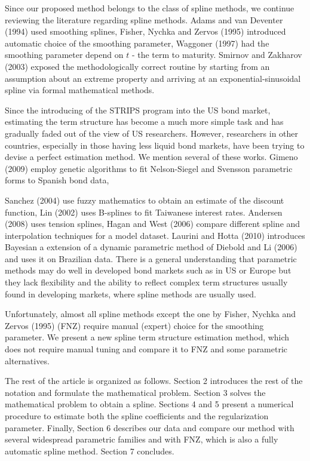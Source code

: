 \documentclass[10pt]{article}
\begin{document}
Since our proposed method belongs to the class of spline methods, we continue reviewing the literature regarding spline methods. Adams and van Deventer (1994) used smoothing splines, Fisher, Nychka and Zervos (1995) introduced automatic choice of the smoothing parameter, Waggoner (1997) had the smoothing parameter depend on $t$ - the term to maturity. Smirnov and Zakharov (2003) exposed the methodologically correct routine by starting from an assumption about an extreme property and arriving at an exponential-sinusoidal spline via formal mathematical methods.

Since the introducing of the STRIPS program into the US bond market, estimating the term structure has become a much more simple task and has gradually faded out of the view of US researchers. However, researchers in other countries, especially in those having less liquid bond markets, have been trying to devise a perfect estimation method. We mention several of these works. Gimeno (2009) employ genetic algorithms to fit Nelson-Siegel and Svensson parametric forms to Spanish bond data,

Sanchez (2004) use fuzzy mathematics to obtain an estimate of the discount function, Lin (2002) uses B-splines to fit Taiwanese interest rates. Andersen (2008) uses tension splines, Hagan and West (2006) compare different spline and interpolation techniques for a model dataset. Laurini and Hotta (2010) introduces Bayesian a extension of a dynamic parametric method of Diebold and Li (2006) and uses it on Brazilian data. There is a general understanding that parametric methods may do well in developed bond markets such as in US or Europe but they lack flexibility and the ability to reflect complex term structures usually found in developing markets, where spline methods are usually used.

Unfortunately, almost all spline methods except the one by Fisher, Nychka and Zervos (1995) (FNZ) require manual (expert) choice for the smoothing parameter. We present a new spline term structure estimation method, which does not require manual tuning and compare it to FNZ and some parametric alternatives.

The rest of the article is organized as follows. Section 2 introduces the rest of the notation and formulate the mathematical problem. Section 3 solves the mathematical problem to obtain a spline. Sections 4 and 5 present a numerical procedure to estimate both the spline coefficients and the regularization parameter. Finally, Section 6 describes our data and compare our method with several widespread parametric families and with FNZ, which is also a fully automatic spline method. Section 7 concludes.
\end{document}
